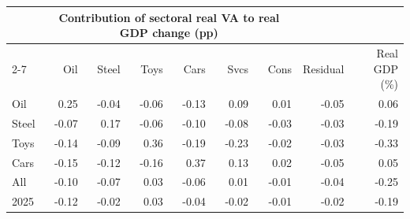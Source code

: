 \begin{tabular}{lrrrrrrrr}
\toprule
 & \multicolumn{6}{c}{Contribution of sectoral real VA to real GDP change (pp)} & & \\
\cmidrule(lr){2-7}
 & Oil & Steel & Toys & Cars & Svcs & Cons & Residual & Real GDP (\%) \\
\midrule
Oil & 0.25 & -0.04 & -0.06 & -0.13 & 0.09 & 0.01 & -0.05 & 0.06 \\
Steel & -0.07 & 0.17 & -0.06 & -0.10 & -0.08 & -0.03 & -0.03 & -0.19 \\
Toys & -0.14 & -0.09 & 0.36 & -0.19 & -0.23 & -0.02 & -0.03 & -0.33 \\
Cars & -0.15 & -0.12 & -0.16 & 0.37 & 0.13 & 0.02 & -0.05 & 0.05 \\
All & -0.10 & -0.07 & 0.03 & -0.06 & 0.01 & -0.01 & -0.04 & -0.25 \\
2025 & -0.12 & -0.02 & 0.03 & -0.04 & -0.02 & -0.01 & -0.02 & -0.19 \\
\bottomrule
\end{tabular}
